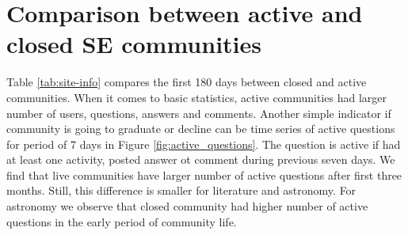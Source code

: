 

\section{Comparison between active and closed SE communities}

Table \ref{tab:site-info} compares the first 180 days between closed and active communities. When it comes to basic statistics, active communities had larger number of users, questions, answers and comments. Another simple indicator if community is going to graduate or decline can be time series of active questions for period of 7 days in Figure \ref{fig:active_questions}. The question is active if had at least one activity, posted answer ot comment during previous seven days. We find that live communities have larger number of active questions after first three months. Still, this difference is smaller for literature and astronomy. For astronomy we observe that closed community had higher number of active questions in the early period of community life.



